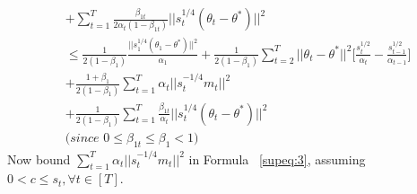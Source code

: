 \documentclass{article}
\begin{document}
\begin{align}
& + \sum_{t=1}^T \frac{\beta_{1t}}{2 \alpha_t (1-\beta_{1t})} \Big \vert \Big \vert s_t^{1/4}(\theta_t - \theta^*) \Big \vert \Big \vert^2 \nonumber \\
& \leq \frac{1}{2 (1 - \beta_1)} \frac{\Big \vert \Big \vert s_1^{1/4}(\theta_{1} - \theta^*) \Big \vert \Big \vert^2} {\alpha_1} + \frac{1}{2(1-\beta_1)} \sum_{t=2}^T \Big \vert \Big \vert \theta_t - \theta^* \Big \vert \Big \vert^2 \Big[ \frac{s_t^{1/2}}{\alpha_t} - \frac{s_{t-1}^{1/2}}{\alpha_{t-1}} \Big] \nonumber \\
&+ \frac{1+\beta_1}{2(1-\beta_1)} \sum_{t=1}^T \alpha_t \Big \vert \Big \vert s_t^{-1/4}m_t \Big \vert \Big \vert^2 \nonumber \\
& + \frac{1}{2 (1-\beta_{1})} \sum_{t=1}^T \frac{\beta_{1t}}{\alpha_t} \Big \vert \Big \vert s_t^{1/4}(\theta_t - \theta^*) \Big \vert \Big \vert^2 \nonumber \\
& \Big( \textit{since\ } 0 \leq \beta_{1t} \leq \beta_1 < 1 \Big)
\end{align}
Now bound $\sum_{t=1}^T \alpha_t \vert \vert s_t^{-1/4}m_t \vert  \vert^2$ in Formula ~\eqref{supeq:3}, assuming $0 < c \leq s_t, \forall t \in [T]$.
\end{document}
